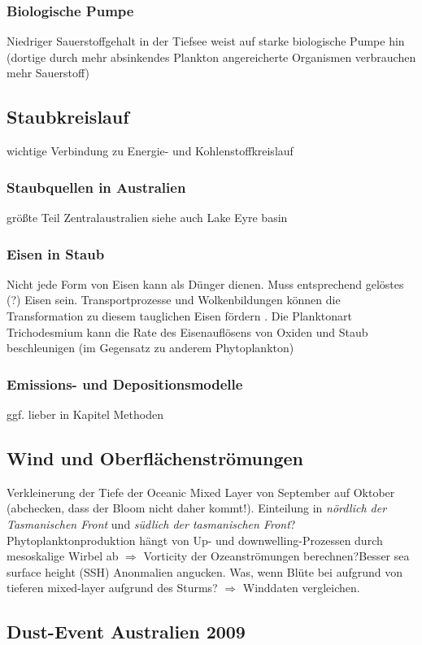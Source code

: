 \documentclass[12pt,a4paper,onecolumn]{scrartcl}
\begin{document}
\subsubsection{Biologische Pumpe}
Niedriger Sauerstoffgehalt in der Tiefsee weist auf starke biologische Pumpe hin (dortige durch mehr absinkendes Plankton angereicherte Organismen verbrauchen mehr Sauerstoff)

\subsection{Staubkreislauf}
wichtige Verbindung zu Energie- und Kohlenstoffkreislauf \citep{Shao.2011}
\subsubsection{Staubquellen in Australien}
größte Teil Zentralaustralien \citep{Shao.2011} siehe auch Lake Eyre basin
\subsubsection{Eisen in Staub}
Nicht jede Form von Eisen kann als Dünger dienen. Muss entsprechend gelöstes (?) Eisen sein. Transportprozesse und Wolkenbildungen können die Transformation zu diesem tauglichen Eisen fördern \citep{Shao.2011}. Die Planktonart Trichodesmium kann die Rate des Eisenauflösens von Oxiden und Staub beschleunigen (im Gegensatz zu anderem Phytoplankton) \citep{Gabric.2016}
\subsubsection{Emissions- und Depositionsmodelle}
ggf. lieber in Kapitel Methoden
\subsection{Wind und Oberflächenströmungen}
Verkleinerung der Tiefe der Oceanic Mixed Layer von September auf Oktober \citep{Tilburg.2002} (abchecken, dass der Bloom nicht daher kommt!). Einteilung in \textit{nördlich der Tasmanischen Front} und \textit{südlich der tasmanischen Front}? Phytoplanktonproduktion hängt von Up- und downwelling-Prozessen durch mesoskalige Wirbel ab \citep{Tilburg.2002} $\Rightarrow$ Vorticity der Ozeanströmungen berechnen?Besser sea surface height (SSH) Anonmalien angucken. Was, wenn Blüte bei \citet{Gabric.2016} aufgrund von tieferen mixed-layer aufgrund des Sturms? $\Rightarrow$ Winddaten vergleichen. 
\subsection{Dust-Event Australien 2009}
\end{document}
